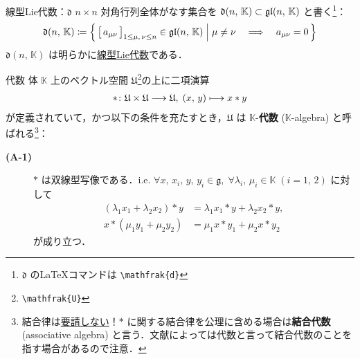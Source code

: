 \documentclass[rep_main]{subfiles}
\begin{document}
\begin{myexample}[label=def:d]{線型Lie代数：$\mathfrak{d}$}
    $n \times n$ 対角行列全体がなす集合を $\mathfrak{d}(n,\, \mathbb{K}) \subset \mathfrak{gl}(n,\, \mathbb{K})$ と書く\footnote{$\mathfrak{d}$ の\LaTeX コマンドは \texttt{\textbackslash mathfrak\{d\}}}：
    \begin{align}
        \mathfrak{d}(n,\, \mathbb{K}) \coloneqq \Bigl\{\, \bigl[\, a_{\mu\nu}\, \bigr]_{1 \le \mu,\, \nu \le n} \in \mathfrak{gl}(n,\, \mathbb{K}) \Bigm| \mu \neq \nu \quad \Longrightarrow \quad a_{\mu\nu} = 0 \,\Bigr\} 
    \end{align}
    $\mathfrak{d}(n,\, \mathbb{K})$ は明らかに\hyperref[def:linearLieAlg]{線型Lie代数}である．
\end{myexample}

\begin{myaxiom}[label=ax:Alg]{代数}
    体 $\mathbb{K}$ 上のベクトル空間 $\mathfrak{U}$\footnote{\texttt{\textbackslash mathfrak\{U\}}}の上に二項演算
    \begin{align}
        * \colon \mathfrak{U} \times \mathfrak{U} \longrightarrow \mathfrak{U},\; (x,\, y) \longmapsto x * y
    \end{align}
    が定義されていて，かつ以下の条件を充たすとき，$\mathfrak{U}$ は $\mathbb{K}$-\textbf{代数} ($\mathbb{K}$-algebra) と呼ばれる\footnote{結合律は\underline{要請しない}！$*$ に関する結合律を公理に含める場合は\textbf{結合代数} (associative algebra) と言う．文献によっては代数と言って結合代数のことを指す場合があるので注意．}：
    \begin{description}
        \item[\textbf{(A-1)}] $*$ は双線型写像である．i.e. $\forall x,\, x_i,\, y,\, y_i \in \mathfrak{g},\; \forall \lambda_i,\, \mu_i \in \mathbb{K}\; (i = 1,\, 2)$ に対して
        \begin{align}
            (\lambda_1 x_1 + \lambda_2 x_2)*y &= \lambda_1 x_1*y + \lambda_2 x_2*y, \\
            x*(\mu_1 y_1 + \mu_2 y_2) &= \mu_1 x*y_1 + \mu_2 x*y_2
        \end{align}
        が成り立つ．
    \end{description}
\end{myaxiom}
\end{document}
